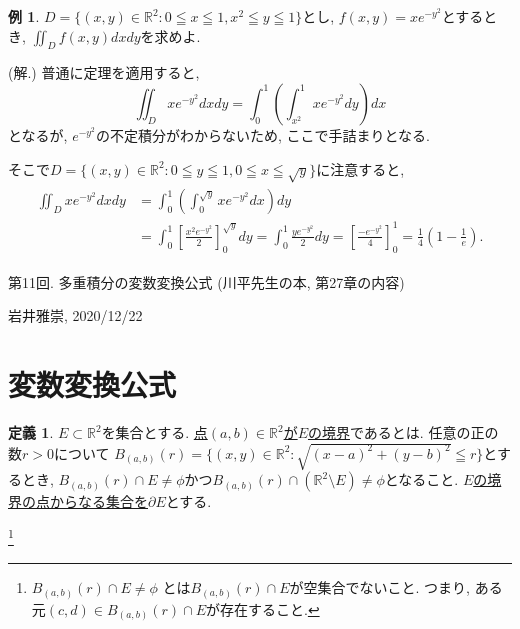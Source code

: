 \documentclass[dvipdfmx,a4paper,11pt]{article}
\newcommand{\R}{\mathbb{R}}
\theoremstyle{definition}
\newtheorem{dfn}[thm]{定義}
\newtheorem{exa}[thm]{例}
\begin{document}
    \begin{exa}
$D = \{ (x,y) \in \R^2 : 0 \leqq x \leqq 1, x^2 \leqq y \leqq 1 \}$とし, 
$f(x,y)=xe^{-y^2}$とするとき,  $\iint_{D}f(x,y)dxdy$を求めよ.

\hspace{-11pt}(解.) 普通に定理を適用すると, 
$$
\iint_{D} xe^{-y^2}dxdy = \int_{0}^{1} \left( \int_{x^2}^{1} xe^{-y^2}dy    \right) dx
$$
となるが, $e^{-y^2}$の不定積分がわからないため, ここで手詰まりとなる.

そこで$D = \{ (x,y) \in \R^2 : 0 \leqq y \leqq 1, 0 \leqq x \leqq \sqrt{y} \}$に注意すると, 
\begin{align*}
\begin{split}
\iint_{D} xe^{-y^2}dxdy &= \int_{0}^{1} \left( \int_{0}^{\sqrt{y}} xe^{-y^2}dx   \right) dy \\
&= \int_{0}^{1}\left[ \frac{x^{2} e^{-y^2} }{2}  \right]_{0}^{\sqrt{y}} dy
=  \int_{0}^{1}    \frac{y e^{-y^2} }{2}      dy
= \left[  \frac{- e^{-y^2} }{4}   \right]_{0}^{1} = \frac{1}{4}\left( 1 - \frac{1}{e}\right).
\end{split}
\end{align*}

  \end{exa}
\newpage

\begin{center}
{\Large 第11回. 多重積分の変数変換公式 (川平先生の本, 第27章の内容)}
\end{center}

\begin{flushright}
 岩井雅崇, 2020/12/22
\end{flushright}


\section{変数変換公式}
 \begin{tcolorbox}[
    colback = white,
    colframe = green!35!black,
    fonttitle = \bfseries,
    breakable = true]
    \begin{dfn}
 $E \subset \R^2$を集合とする. 
 \underline{点$(a,b) \in \R^2$が$E$の境界}であるとは. 任意の正の数$r>0$について
 $B_{(a,b)}(r) = \{ (x,y)\in \R^2 :\sqrt{(x-a)^2 + (y-b)^2 } \leqq r  \}$とするとき, 
 $B_{(a,b)}(r) \cap E \neq \phi$かつ$B_{(a,b)}(r) \cap (\R^2 \setminus E) \neq \phi$となること.
\underline{ $E$の境界の点からなる集合を$\partial E$}とする.
 \end{dfn}
 \end{tcolorbox}
 \footnote{ $B_{(a,b)}(r) \cap E \neq \phi$ とは$B_{(a,b)}(r) \cap E$が空集合でないこと. つまり, ある元$(c,d) \in B_{(a,b)}(r) \cap E $が存在すること.}
 
\end{document}
